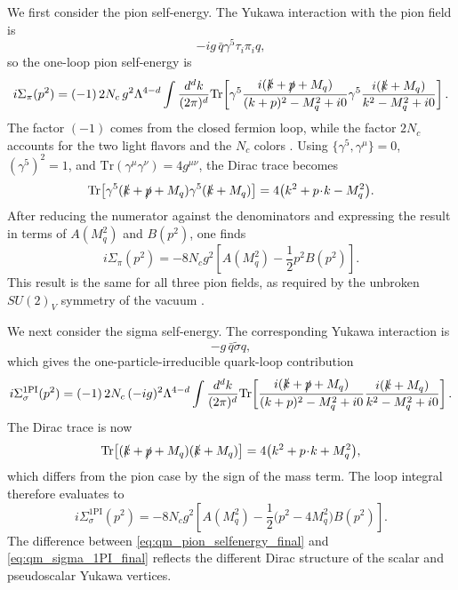 We first consider the pion self-energy. The Yukawa interaction with
the pion field is
\begin{equation}
-ig\,\bar q \gamma^5 \tau_i \pi_i q ,
\end{equation}
so the one-loop pion self-energy is
\begin{equation}
i\Sigma_\pi(p^2)
=
(-1)\,2N_c\,g^2 \Lambda^{4-d}
\int\frac{d^d k}{(2\pi)^d}
\mathrm{Tr}\!\left[
\gamma^5
\frac{i(\slashed{k}+\slashed{p}+M_q)}{(k+p)^2-M_q^2+i0}
\gamma^5
\frac{i(\slashed{k}+M_q)}{k^2-M_q^2+i0}
\right].
\label{eq:qm_sigma_pi_start}
\end{equation}
The factor \((-1)\) comes from the closed fermion loop, while the
factor \(2N_c\) accounts for the two light flavors and the \(N_c\)
colors \cite{Folkestad2018}. Using
\(\{\gamma^5,\gamma^\mu\}=0\), \((\gamma^5)^2=1\), and
\(\mathrm{Tr}(\gamma^\mu\gamma^\nu)=4g^{\mu\nu}\), the Dirac trace becomes
\begin{equation}
\mathrm{Tr}\!\left[
\gamma^5(\slashed{k}+\slashed{p}+M_q)\gamma^5(\slashed{k}+M_q)
\right]
=
4\bigl(k^2+p\!\cdot\! k-M_q^2\bigr).
\end{equation}
After reducing the numerator against the denominators and expressing
the result in terms of \(A(M_q^2)\) and \(B(p^2)\), one finds
\begin{equation}
i\Sigma_\pi(p^2)
=
-8N_c g^2
\left[
A(M_q^2)-\frac{1}{2}p^2 B(p^2)
\right].
\label{eq:qm_pion_selfenergy_final}
\end{equation}
This result is the same for all three pion fields, as required by the
unbroken \(SU(2)_V\) symmetry of the vacuum \cite{Folkestad2018}.

We next consider the sigma self-energy. The corresponding Yukawa
interaction is
\begin{equation}
-g\,\bar q \tilde{\sigma} q ,
\end{equation}
which gives the one-particle-irreducible quark-loop contribution
\begin{equation}
i\Sigma_{\sigma}^{\mathrm{1PI}}(p^2)
=
(-1)\,2N_c\,(-ig)^2 \Lambda^{4-d}
\int\frac{d^d k}{(2\pi)^d}
\mathrm{Tr}\!\left[
\frac{i(\slashed{k}+\slashed{p}+M_q)}{(k+p)^2-M_q^2+i0}
\frac{i(\slashed{k}+M_q)}{k^2-M_q^2+i0}
\right].
\label{eq:qm_sigma_selfenergy_start}
\end{equation}
The Dirac trace is now
\begin{equation}
\mathrm{Tr}\!\left[
(\slashed{k}+\slashed{p}+M_q)(\slashed{k}+M_q)
\right]
=
4\bigl(k^2+p\!\cdot\! k+M_q^2\bigr),
\end{equation}
which differs from the pion case by the sign of the mass term. The
loop integral therefore evaluates to
\begin{equation}
i\Sigma_{\sigma}^{\mathrm{1PI}}(p^2)
=
-8N_c g^2
\left[
A(M_q^2)-\frac{1}{2}\bigl(p^2-4M_q^2\bigr)B(p^2)
\right].
\label{eq:qm_sigma_1PI_final}
\end{equation}
The difference between \eqref{eq:qm_pion_selfenergy_final} and
\eqref{eq:qm_sigma_1PI_final} reflects the different Dirac structure
of the scalar and pseudoscalar Yukawa vertices.

